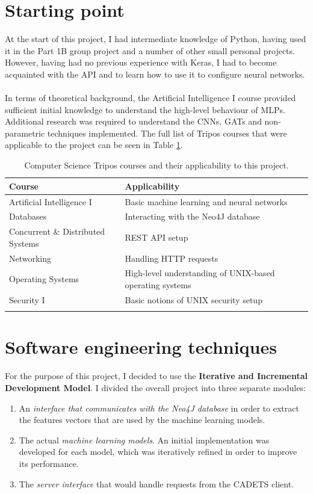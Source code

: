 	\section{Starting point} \label{Section 2.6}
	At the start of this project, I had intermediate knowledge of Python, having used it in the Part 1B group project and a number of other small personal projects. However, having had no previous experience with Keras, I had to become acquainted with the API and to learn how to use it to configure neural networks.   
	\\ \\
	In terms of theoretical background, the Artificial Intelligence I course provided sufficient initial knowledge to understand the high-level behaviour of MLPs. Additional research was required to understand the CNNs, GATs and non-parametric techniques implemented. The full list of Tripos courses that were applicable to the project can be seen in Table \ref{Table 2.4}.
	
	\begin{longtable}{|p{} | p{}|}
		\textbf{Course} & \textbf{Applicability} \\ 
		\hline
		Artificial Intelligence I & Basic machine learning and neural networks \\
		Databases & Interacting with the Neo4J database \\
		Concurrent \& Distributed Systems & REST API setup \\ 
		Networking & Handling HTTP requests \\
		Operating Systems & High-level understanding of UNIX-based operating systems\\
		Security I & Basic notions of UNIX security setup \\
		\hline
		\caption[Computer Science Tripos courses and their applicability to this project.]{\centering Computer Science Tripos courses and their applicability to this project.}
		\label{Table 2.4}
	\end{longtable}
	
	\section{Software engineering techniques}
	For the purpose of this project, I decided to use the \textbf{Iterative and Incremental Development Model}. I divided the overall project into three separate modules: 
	\begin{enumerate}
		\item An \textit{interface that communicates with the Neo4J database} in order to extract the features vectors that are used by the machine learning models.
		\item The actual \textit{machine learning models}. 	An initial implementation was developed for each model, which was iteratively refined in order to improve its performance.  
		\item The \textit{server interface} that would handle requests from the CADETS client.
	\end{enumerate}

